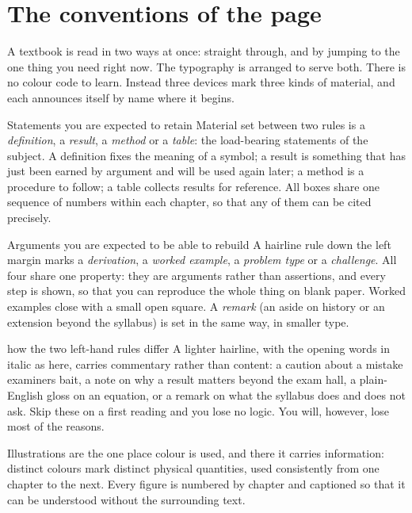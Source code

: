 \section*{The conventions of the page}
\begingroup\renewcommand{\thebxcount}{\unskip}

A textbook is read in two ways at once: straight through, and by jumping to the one thing you need
right now. The typography is arranged to serve both. There is no colour code to learn. Instead three
devices mark three kinds of material, and each announces itself by name where it begins.

\begin{defbox}{Statements you are expected to retain}
Material set between two rules is a \emph{definition}, a \emph{result}, a \emph{method} or a
\emph{table}: the load-bearing statements of the subject. A definition fixes the meaning of a symbol; a
result is something that has just been earned by argument and will be used again later; a method is a
procedure to follow; a table collects results for reference. All boxes share one sequence of numbers
within each chapter, so that any of them can be cited precisely.
\end{defbox}

\begin{derivbox}{Arguments you are expected to be able to rebuild}
A hairline rule down the left margin marks a \emph{derivation}, a \emph{worked example}, a
\emph{problem type} or a \emph{challenge}. All four share one property: they are arguments rather than
assertions, and every step is shown, so that you can reproduce the whole thing on blank paper. Worked
examples close with a small open square. A \emph{remark} (an aside on history or an extension beyond
the syllabus) is set in the same way, in smaller type.
\end{derivbox}

\begin{trapbox}{how the two left-hand rules differ}
A lighter hairline, with the opening words in italic as here, carries commentary rather than content:
a caution about a mistake examiners bait, a note on why a result matters beyond the exam hall, a
plain-English gloss on an equation, or a remark on what the syllabus does and does not ask. Skip these
on a first reading and you lose no logic. You will, however, lose most of the reasons.
\end{trapbox}

Illustrations are the one place colour is used, and there it carries information: distinct colours
mark distinct physical quantities, used consistently from one chapter to the next. Every figure is
numbered by chapter and captioned so that it can be understood without the surrounding text.

